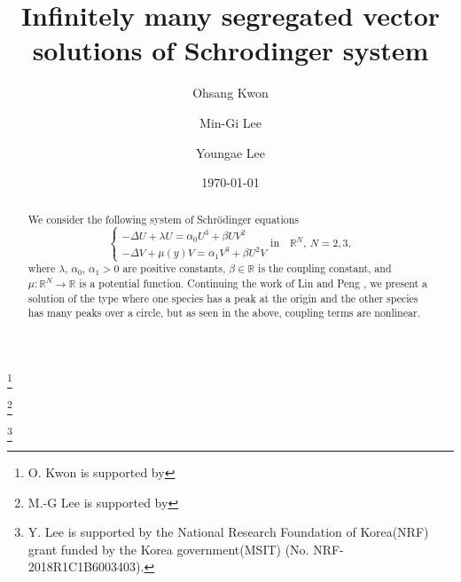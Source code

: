\documentclass{amsart}
\theoremstyle{definition}
\theoremstyle{remark}
\numberwithin{equation}{section}
\begin{document}
 
\title{Infinitely many segregated vector solutions of Schrodinger system} 



\author{Ohsang Kwon}
\address{Department of Mathematics, Chungbuk National University, Cheongju, South Korea}
\thanks{O. Kwon is supported by }

\author{Min-Gi Lee}
\address{Department of Mathematics, Kyungpook National University, Daegu, South Korea}
\thanks{M.-G Lee is supported by }

\author{Youngae Lee}
\address{Department of Mathematical Sciences, College of Natural Sciences,  Ulsan National Institute of Science and Technology (UNIST), South Korea}
\thanks{ Y. Lee is supported by the National Research Foundation of Korea(NRF) grant funded by the Korea government(MSIT) (No. NRF-2018R1C1B6003403). }


\date{\today}



\begin{abstract}
We consider the following system of Schr\"odinger equations
\begin{equation*}\left.\begin{cases}
 -\Delta U + \lambda U = \alpha_0 U^3+ \beta UV^2\\
 -\Delta V + \mu(y) V = \alpha_1 V^3+\beta U^2V 
\end{cases}\right. \text{in} \quad \mathbb{R}^N, \ N=2,  3,\end{equation*}
where  $\lambda$, $\alpha_0$, $\alpha_1>0$ are positive constants,    $\beta \in \mathbb{R}$ is the  coupling constant, and $\mu: \mathbb{R}^N \rightarrow \mathbb{R}$ is a potential function. Continuing the work of Lin and Peng  \cite{lin_peng_2014}, we present a solution of the type where one species has a peak at the origin and the other species has many peaks over a circle, but as seen in the above, coupling terms are nonlinear. 
\end{abstract}

\maketitle
\end{document}
